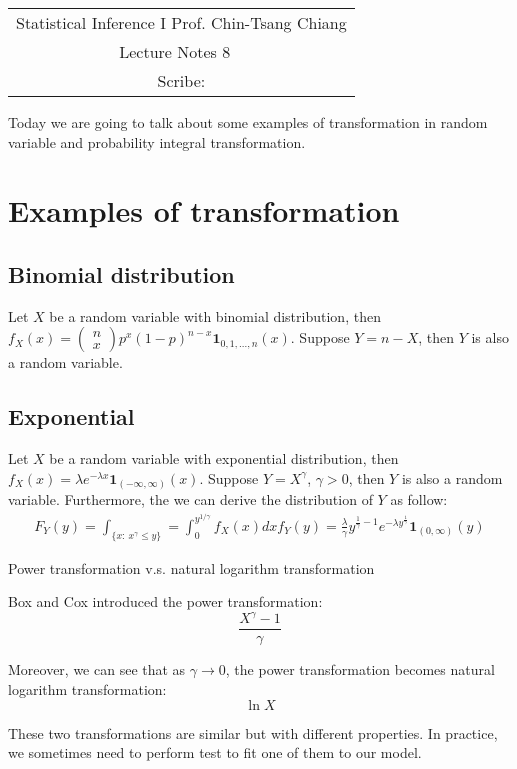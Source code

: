 \documentclass[../Transformation.tex]{subfiles}
\begin{document}
	\begin{center}
		\renewcommand{\arraystretch}{2}
		\begin{bfseries}
			\begin{tabular}{|c|}
				\hline
				Statistical Inference I \hfill Prof. Chin-Tsang Chiang\\
				\hspace{15em} {\large Lecture Notes 8} \hspace{15em}\ \\
				\lecdate \hfill Scribe: \scribe\\
				\hline
			\end{tabular}
			\renewcommand{\arraystretch}{1}
		\end{bfseries}
	\end{center}
Today we are going to talk about some examples of transformation in random variable and probability integral transformation.

\section{Examples of transformation}
\subsection{Binomial distribution}
Let $X$ be a random variable with binomial distribution, then $f_X(x) = \left(\begin{array}{c}
n\\
x
\end{array}\right)p^x(1-p)^{n-x}\mathbf{1}_{0,1,...,n}(x)$. Suppose $Y=n-X$, then $Y$ is also a random variable.

\subsection{Exponential}
Let $X$ be a random variable with exponential distribution, then $f_X(x) = \lambda e^{-\lambda x}\mathbf{1}_{(-\infty,\infty)}(x)$. Suppose $Y=X^{\gamma}$, $\gamma>0$, then $Y$ is also a random variable. Furthermore, the we can derive the distribution of $Y$ as follow:
\begin{align*}
F_Y(y) = \int_{\{x:\ x^{\gamma}\leq y \}} = \int_0^{y^{1/\gamma}}f_X(x)dx
f_Y(y) = \frac{\lambda}{\gamma}y^{\frac{1}{\gamma}-1}e^{-\lambda y^{\frac{1}{\gamma}}}\mathbf{1}_{(0,\infty)}(y)
\end{align*}

\begin{remark}{Power transformation v.s. natural logarithm transformation}
	
Box and Cox introduced the power transformation:
$$\frac{X^{\gamma}-1}{\gamma}$$

Moreover, we can see that as $\gamma\rightarrow0$, the power transformation becomes natural logarithm transformation:
$$\ln X$$

These two transformations are similar but with different properties. In practice, we sometimes need to perform test to fit one of them to our model.
\end{remark}
\end{document}
